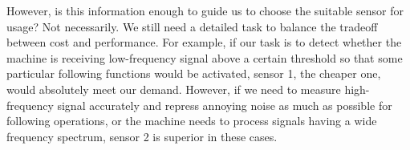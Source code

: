 \documentclass[12pt,a4paper,twocolumn]{article}
\begin{document}
However, is this information enough to guide us to choose the suitable sensor for usage? Not necessarily. We still need a detailed task to balance the tradeoff between cost and performance. For example, if our task is to detect whether the machine is receiving low-frequency signal above a certain threshold so that some particular following functions would be activated, sensor 1, the cheaper one, would absolutely meet our demand. However, if we need to measure high-frequency signal accurately and repress annoying noise as much as possible for following operations, or the machine needs to process signals having a wide frequency spectrum, sensor 2 is superior in these cases. 



\end{document}
